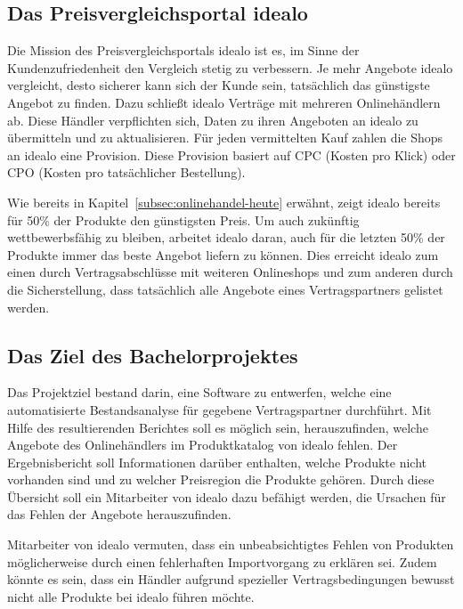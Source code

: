 \subsection{Das Preisvergleichsportal idealo}
\label{subsec:idealo}

Die Mission des Preisvergleichsportals idealo ist es, im Sinne der Kundenzufriedenheit den Vergleich stetig zu
verbessern.
Je mehr Angebote idealo vergleicht, desto sicherer kann sich der Kunde sein, tatsächlich das günstigste Angebot zu
finden.
Dazu schließt idealo Verträge mit mehreren Onlinehändlern ab.
Diese Händler verpflichten sich, Daten zu ihren Angeboten an idealo zu übermitteln und zu aktualisieren.
Für jeden vermittelten Kauf zahlen die Shops an idealo eine Provision.
Diese Provision basiert auf CPC (Kosten pro Klick) oder CPO (Kosten pro tatsächlicher Bestellung).

Wie bereits in Kapitel~\ref{subsec:onlinehandel-heute} erwähnt, zeigt idealo bereits für 50\% der Produkte den
günstigsten Preis.
Um auch zukünftig wettbewerbsfähig zu bleiben, arbeitet idealo daran, auch für die letzten 50\% der Produkte
immer das beste Angebot liefern zu können.
Dies erreicht idealo zum einen durch Vertragsabschlüsse mit weiteren Onlineshops und zum anderen durch die
Sicherstellung, dass tatsächlich alle Angebote eines Vertragspartners gelistet werden.

\subsection{Das Ziel des Bachelorprojektes}
\label{subsec:projektziel}

Das Projektziel bestand darin, eine Software zu entwerfen, welche eine automatisierte Bestandsanalyse für
gegebene Vertragspartner durchführt.
Mit Hilfe des resultierenden Berichtes soll es möglich sein, herauszufinden, welche Angebote des Onlinehändlers im
Produktkatalog von idealo fehlen.
Der Ergebnisbericht soll Informationen darüber enthalten, welche Produkte nicht vorhanden sind und zu welcher
Preisregion die Produkte gehören.
Durch diese Übersicht soll ein Mitarbeiter von idealo dazu befähigt werden, die Ursachen für das Fehlen der Angebote
herauszufinden.

Mitarbeiter von idealo vermuten, dass ein unbeabsichtigtes Fehlen von Produkten möglicherweise durch einen fehlerhaften
Importvorgang zu erklären sei.
Zudem könnte es sein, dass ein Händler aufgrund spezieller Vertragsbedingungen bewusst nicht alle
Produkte bei idealo führen möchte.

